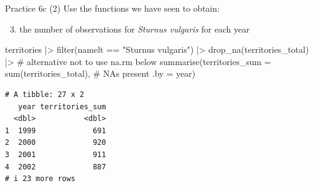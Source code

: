 \documentclass[
  ignorenonframetext,
  aspectratio=169,
  t]{beamer}
\newenvironment{Shaded}{\begin{snugshade}}{\end{snugshade}}
\newcommand{\AttributeTok}[1]{\textcolor[rgb]{0.40,0.45,0.13}{#1}}
\newcommand{\CommentTok}[1]{\textcolor[rgb]{0.37,0.37,0.37}{#1}}
\newcommand{\FunctionTok}[1]{\textcolor[rgb]{0.28,0.35,0.67}{#1}}
\newcommand{\NormalTok}[1]{\textcolor[rgb]{0.00,0.23,0.31}{#1}}
\newcommand{\SpecialCharTok}[1]{\textcolor[rgb]{0.37,0.37,0.37}{#1}}
\newcommand{\StringTok}[1]{\textcolor[rgb]{0.13,0.47,0.30}{#1}}
\providecommand{\tightlist}{%
  \setlength{\itemsep}{0pt}\setlength{\parskip}{0pt}}
\begin{document}
\begin{frame}[fragile]{Practice 6c (2)}
\protect{}\label{practice-6c-2}
Use the functions we have seen to obtain:

\begin{enumerate}
\setcounter{enumi}{2}
\tightlist
\item
  the number of observations for \emph{Sturnus vulgaris} for each year
\end{enumerate}

\footnotesize

\begin{Shaded}
\begin{Highlighting}[]
\NormalTok{territories }\SpecialCharTok{|\textgreater{}} 
    \FunctionTok{filter}\NormalTok{(namelt }\SpecialCharTok{==} \StringTok{"Sturnus vulgaris"}\NormalTok{) }\SpecialCharTok{|\textgreater{}} 
    \FunctionTok{drop\_na}\NormalTok{(territories\_total) }\SpecialCharTok{|\textgreater{}} \CommentTok{\# alternative not to use na.rm below}
    \FunctionTok{summarise}\NormalTok{(}\AttributeTok{territories\_sum =} \FunctionTok{sum}\NormalTok{(territories\_total), }\CommentTok{\# NAs present}
              \AttributeTok{.by =}\NormalTok{ year)}
\end{Highlighting}
\end{Shaded}

\begin{verbatim}
# A tibble: 27 x 2
   year territories_sum
  <dbl>           <dbl>
1  1999             691
2  2000             920
3  2001             911
4  2002             887
# i 23 more rows
\end{verbatim}

\normalsize
\end{frame}
\end{document}
